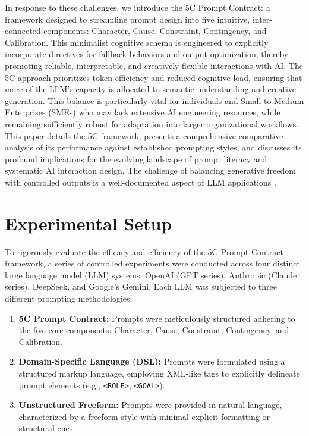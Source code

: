 \documentclass[10pt, a4paper]{article}
\begin{document}
In response to these challenges, we introduce the 5C Prompt Contract: a framework designed to streamline prompt design into five intuitive, inter-connected components: Character, Cause, Constraint, Contingency, and Calibration. This minimalist cognitive schema is engineered to explicitly incorporate directives for fallback behaviors and output optimization, thereby promoting reliable, interpretable, and creatively flexible interactions with AI. The 5C approach prioritizes token efficiency and reduced cognitive load, ensuring that more of the LLM's capacity is allocated to semantic understanding and creative generation. This balance is particularly vital for individuals and Small-to-Medium Enterprises (SMEs) who may lack extensive AI engineering resources, while remaining sufficiently robust for adaptation into larger organizational workflows. This paper details the 5C framework, presents a comprehensive comparative analysis of its performance against established prompting styles, and discusses its profound implications for the evolving landscape of prompt literacy and systematic AI interaction design. The challenge of balancing generative freedom with controlled outputs is a well-documented aspect of LLM applications \cite{vaswani2017attention}.

\section{Experimental Setup}
To rigorously evaluate the efficacy and efficiency of the 5C Prompt Contract framework, a series of controlled experiments were conducted across four distinct large language model (LLM) systems: OpenAI (GPT series), Anthropic (Claude series), DeepSeek, and Google's Gemini. Each LLM was subjected to three different prompting methodologies:

\begin{enumerate}
    \item \textbf{5C Prompt Contract:} Prompts were meticulously structured adhering to the five core components: Character, Cause, Constraint, Contingency, and Calibration.
    \item \textbf{Domain-Specific Language (DSL):} Prompts were formulated using a structured markup language, employing XML-like tags to explicitly delineate prompt elements (e.g., \texttt{<ROLE>}, \texttt{<GOAL>}).
    \item \textbf{Unstructured Freeform:} Prompts were provided in natural language, characterized by a freeform style with minimal explicit formatting or structural cues.
\end{enumerate}
\end{document}
